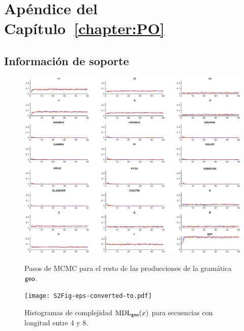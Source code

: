\chapter{Apéndice del Capítulo~\ref{chapter:PO}}\label{app:PO}

\section{Información de soporte}

\begin{figure}[htpb]
    \centering
    \hbox{\hspace{-2.5em}\includegraphics[width=1.2\textwidth]{figuras/plosone/S1Fig-eps-converted-to-a.pdf}}
    \hbox{\hspace{-2.5em}\includegraphics[width=1.2\textwidth]{figuras/plosone/S1Fig-eps-converted-to-b.pdf}}
    \caption{Pasos de MCMC para el resto de las producciones de la gramática ${\sf geo}$.}
    \label{S1_Fig}
\end{figure}

\begin{figure}[htpb]
    \centering
    \hbox{\hspace{-2.5em}\texttt{[image: S2Fig-eps-converted-to.pdf]}}
    \caption{Histogramas de complejidad ${\rm MDL}_{{\sf geo}}(x)$ para secuencias con longitud entre 4 y 8.}
    \label{S2_Fig}
\end{figure}

